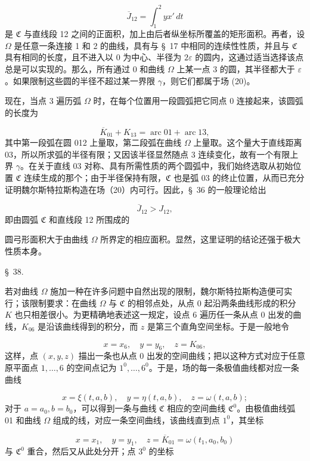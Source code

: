 \documentclass[11pt,a4paper,leqno]{article}
\begin{document}
\[
\overline{J}_{12}=\int_1^2 yx'\,dt
\]
是 $\mathfrak{C}$ 与直线段 12 之间的正面积，加上由后者纵坐标所覆盖的矩形面积。再者，设 $\Omega$ 是任意一条连接 1 和 2 的曲线，具有与 \S~17 中相同的连续性性质，并且与 $\mathfrak{C}$ 具有相同的长度，且不进入以 0 为中心、半径为 $2\varepsilon$ 的圆内，这通过适当选择该点总是可以实现的。那么，所有通过 0 和曲线 $\Omega$ 上某一点 3 的圆，其半径都大于 $\varepsilon$。如果限制这些圆的半径不超过某一界限 $\gamma$，则它们都属于场 (20)。

现在，当点 3 遍历弧 $\Omega$ 时，在每个位置用一段圆弧把它同点 0 连接起来，该圆弧的长度为

\[
\overline{K}_{01}+K_{13}=\operatorname{arc}01+\operatorname{arc}13,
\]
其中第一段弧在圆 012 上量取，第二段弧在曲线 $\Omega$ 上量取。这个量大于直线距离 03，所以所求弧的半径有限；又因该半径显然随点 3 连续变化，故有一个有限上界 $\gamma$。在关于直线 03 对称、具有所需性质的两个圆弧中，我们始终选取从初始位置 $\mathfrak{C}$ 连续生成的那个；由于半径保持有限，$\mathfrak{C}$ 也是弧 03 的终止位置，从而已充分证明魏尔斯特拉斯构造在场（20）内可行。因此，\S~36 的一般理论给出

\[
\overline{J}_{12}>J_{12},
\]
即由圆弧 $\mathfrak{C}$ 和直线段 12 所围成的

圆弓形面积大于由曲线 $\Omega$ 所界定的相应面积。显然，这里证明的结论还强于极大性质本身。

\begin{center}
{\large \S~38.}
\end{center}
若对曲线 $\Omega$ 施加一种在许多问题中自然出现的限制，魏尔斯特拉斯构造便可实行；该限制要求：在曲线 $\Omega$ 与 $\mathfrak{C}$ 的相邻点处，从点 0 起沿两条曲线形成的积分 $K$ 也只相差很小。为更精确地表述这一规定，设点 6 遍历任一条从点 0 出发的曲线，$K_{06}$ 是沿该曲线得到的积分，而 $z$ 是第三个直角空间坐标。于是一般地令

\[
x=x_6,\quad y=y_6,\quad z=K_{06},
\]
这样，点 $(x,y,z)$ 描出一条也从点 0 出发的空间曲线；把以这种方式对应于任意原平面点 $1,\ldots,6$ 的空间点记为 $1^0,\ldots,6^0$。于是，场的每一条极值曲线都对应一条曲线

\[
x=\xi(t,a,b),\quad y=\eta(t,a,b),\quad z=\omega(t,a,b);
\]
对于 $a=a_0,b=b_0$，可以得到一条与曲线 $\mathfrak{C}$ 相应的空间曲线 $\mathfrak{C}^0$。由极值曲线弧 01 和曲线 $\Omega$ 组成的线，对应一条空间曲线，该曲线直到点 $1^0$，其坐标

\[
x=x_1,\quad y=y_1,\quad z=\overline{K}_{01}=\omega(t_1,a_0,b_0)
\]
与 $\mathfrak{C}^0$ 重合，然后又从此处分开；点 $3^0$ 的坐标
\end{document}
